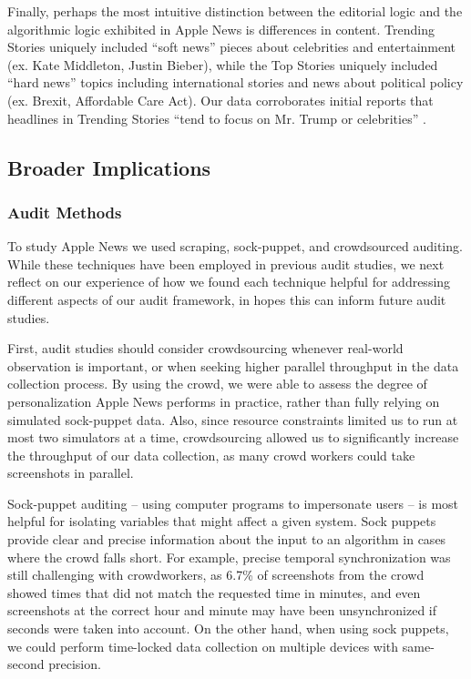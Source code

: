 Finally, perhaps the most intuitive distinction between the editorial logic and the algorithmic logic exhibited in Apple News is differences in content. Trending Stories uniquely included ``soft news'' \citep{Reinemann2012} pieces about celebrities and entertainment (ex. Kate Middleton, Justin Bieber), while the Top Stories uniquely included ``hard news'' topics including international stories and news about political policy (ex. Brexit, Affordable Care Act). Our data corroborates initial reports that headlines in Trending Stories ``tend to focus on Mr. Trump or celebrities'' \citep{Nicas2018}.


\subsection{Broader Implications}

\subsubsection{Audit Methods}
To study Apple News we used scraping, sock-puppet, and crowdsourced auditing. While these techniques have been employed in previous audit studies, we next reflect on our experience of how we found each technique helpful for addressing different aspects of our audit framework, in hopes this can inform future audit studies. 

First, audit studies should consider crowdsourcing whenever real-world observation is important, or when seeking higher parallel throughput in the data collection process. By using the crowd, we were able to assess the degree of personalization Apple News performs in practice, rather than fully relying on simulated sock-puppet data. Also, since resource constraints limited us to run at most two simulators at a time, crowdsourcing allowed us to significantly increase the throughput of our data collection, as many crowd workers could take screenshots in parallel.

Sock-puppet auditing -- using computer programs to impersonate users \citep{Sandvig2014} -- is most helpful for isolating variables that might affect a given system. Sock puppets provide clear and precise information about the input to an algorithm in cases where the crowd falls short. For example, precise temporal synchronization was still challenging with crowdworkers, as 6.7\% of screenshots from the crowd showed times that did not match the requested time in minutes, and even screenshots at the correct hour and minute may have been unsynchronized if seconds were taken into account. On the other hand, when using sock puppets, we could perform time-locked data collection on multiple devices with same-second precision.

